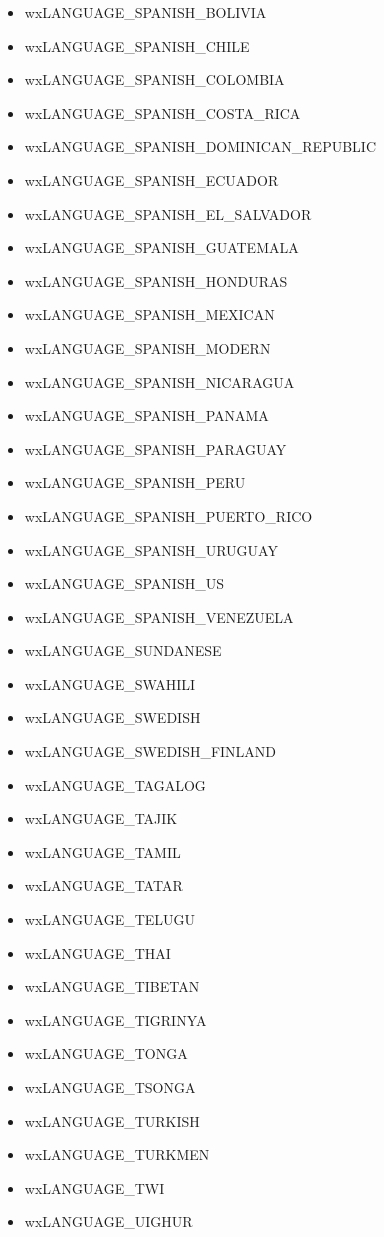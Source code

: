 \begin{itemize}
\item wxLANGUAGE\_SPANISH\_BOLIVIA
\item wxLANGUAGE\_SPANISH\_CHILE
\item wxLANGUAGE\_SPANISH\_COLOMBIA
\item wxLANGUAGE\_SPANISH\_COSTA\_RICA
\item wxLANGUAGE\_SPANISH\_DOMINICAN\_REPUBLIC
\item wxLANGUAGE\_SPANISH\_ECUADOR
\item wxLANGUAGE\_SPANISH\_EL\_SALVADOR
\item wxLANGUAGE\_SPANISH\_GUATEMALA
\item wxLANGUAGE\_SPANISH\_HONDURAS
\item wxLANGUAGE\_SPANISH\_MEXICAN
\item wxLANGUAGE\_SPANISH\_MODERN
\item wxLANGUAGE\_SPANISH\_NICARAGUA
\item wxLANGUAGE\_SPANISH\_PANAMA
\item wxLANGUAGE\_SPANISH\_PARAGUAY
\item wxLANGUAGE\_SPANISH\_PERU
\item wxLANGUAGE\_SPANISH\_PUERTO\_RICO
\item wxLANGUAGE\_SPANISH\_URUGUAY
\item wxLANGUAGE\_SPANISH\_US
\item wxLANGUAGE\_SPANISH\_VENEZUELA
\item wxLANGUAGE\_SUNDANESE
\item wxLANGUAGE\_SWAHILI
\item wxLANGUAGE\_SWEDISH
\item wxLANGUAGE\_SWEDISH\_FINLAND
\item wxLANGUAGE\_TAGALOG
\item wxLANGUAGE\_TAJIK
\item wxLANGUAGE\_TAMIL
\item wxLANGUAGE\_TATAR
\item wxLANGUAGE\_TELUGU
\item wxLANGUAGE\_THAI
\item wxLANGUAGE\_TIBETAN
\item wxLANGUAGE\_TIGRINYA
\item wxLANGUAGE\_TONGA
\item wxLANGUAGE\_TSONGA
\item wxLANGUAGE\_TURKISH
\item wxLANGUAGE\_TURKMEN
\item wxLANGUAGE\_TWI
\item wxLANGUAGE\_UIGHUR

\end{itemize}
